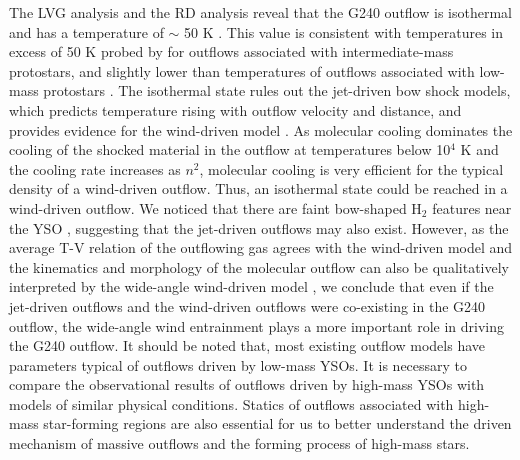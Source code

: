 The LVG analysis and the RD analysis reveal that the G240 outflow is isothermal and has a temperature of $\sim$ 50 K . This value is consistent with temperatures in excess of 50 K probed by \citet{2016A&A...587A..17V} for outflows associated with intermediate-mass protostars, and slightly lower than temperatures of outflows associated with low-mass protostars \citep{2009A&A...501..633V, 2012A&A...542A..86Y}. The isothermal state rules out the jet-driven bow shock models, which predicts temperature rising with outflow velocity and distance, and provides evidence for the wind-driven model \citep{2007prpl.conf..245A}. As molecular cooling dominates the cooling of the shocked material in the outflow at temperatures below 10$^4$ K \citep{1997IAUS..182..181H} and the cooling rate increases as $n^2$, molecular cooling is very efficient for the typical density of a wind-driven outflow. Thus, an isothermal state could be reached in a wind-driven outflow. We noticed that there are faint bow-shaped H$_{2}$ features near the YSO , suggesting that the jet-driven outflows may also exist. However, as the average T-V relation of the outflowing gas agrees with the wind-driven model and the kinematics and morphology of the molecular outflow can also be qualitatively interpreted by the wide-angle wind-driven model \citep{2009ApJ...696...66Q}, we conclude that even if the jet-driven outflows and the wind-driven outflows were co-existing in the G240 outflow, the wide-angle wind entrainment plays a more important role in driving the G240 outflow. It should be noted that, most existing outflow models have parameters typical of outflows driven by low-mass YSOs. It is necessary to compare the observational results of outflows driven by high-mass YSOs with models of similar physical conditions. Statics of outflows associated with high-mass star-forming regions are also essential for us to better understand the driven mechanism of massive outflows and the forming process of high-mass stars.

